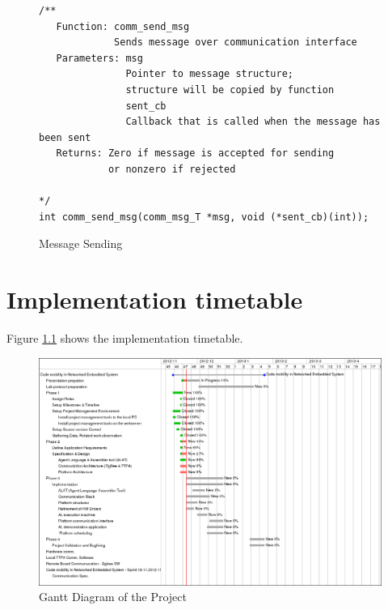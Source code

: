 \documentclass{scrreprt}
\begin{document}
\begin{figure}[!htb]
\lstset{language=C}
\begin{lstlisting}[frame=single]
/** 
   Function: comm_send_msg
             Sends message over communication interface
   Parameters: msg 
               Pointer to message structure; 
               structure will be copied by function
               sent_cb 
               Callback that is called when the message has been sent
   Returns: Zero if message is accepted for sending 
            or nonzero if rejected

*/
int comm_send_msg(comm_msg_T *msg, void (*sent_cb)(int)); 
\end{lstlisting}
\caption{Message Sending}
\label{fig:comm_send_msg}
\end{figure}


\chapter{Implementation timetable}

Figure \ref{fig:ganttdiag} shows the implementation timetable.

\begin{figure}[!htb]
\centering
\includegraphics[scale=0.4]{figures/gantt.png}
\caption{Gantt Diagram of the Project}
\label{fig:ganttdiag}
\end{figure}
\end{document}
